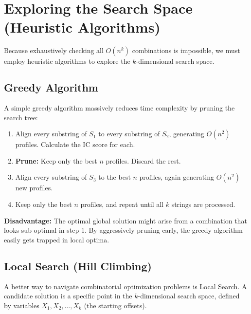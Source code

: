 
\section{Exploring the Search Space (Heuristic Algorithms)}
Because exhaustively checking all $O(n^k)$ combinations is impossible, we must employ heuristic algorithms to explore the $k$-dimensional search space.

\subsection{Greedy Algorithm}
A simple greedy algorithm massively reduces time complexity by pruning the search tree:
\begin{enumerate}
  \item Align every substring of $S_1$ to every substring of $S_2$, generating $O(n^2)$ profiles. Calculate the IC score for each.
  \item \textbf{Prune:} Keep only the best $n$ profiles. Discard the rest.
  \item Align every substring of $S_3$ to the best $n$ profiles, again generating $O(n^2)$ new profiles.
  \item Keep only the best $n$ profiles, and repeat until all $k$ strings are processed.
\end{enumerate}

\textbf{Disadvantage:} The optimal global solution might arise from a combination that looks sub-optimal in step 1. By aggressively pruning early, the greedy algorithm easily gets trapped in local optima.

\subsection{Local Search (Hill Climbing)}
A better way to navigate combinatorial optimization problems is Local Search. A candidate solution is a specific point in the $k$-dimensional search space, defined by variables $X_1, X_2, \dots, X_k$ (the starting offsets).

